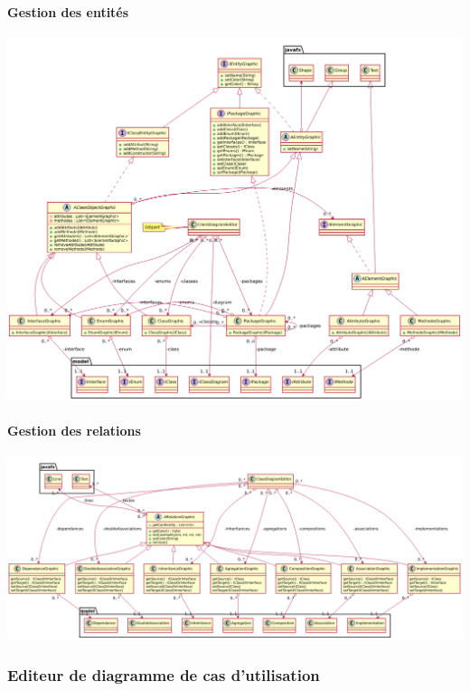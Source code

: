 \documentclass[a4paper,10pt]{article}
\begin{document}
	 \paragraph{Gestion des entités}
	  \begin{center}
	      \includegraphics[width=\textwidth]{Image/ClassDiagramEditor.png}
	  \end{center}
	  
	 \paragraph{Gestion des relations}
	  \begin{center}
	      \includegraphics[width=\textwidth]{Image/ClassDiagramEditorRelation.png}
	  \end{center}
	  
	  \newpage
   \subsubsection{Editeur de diagramme de cas d'utilisation}
\end{document}
